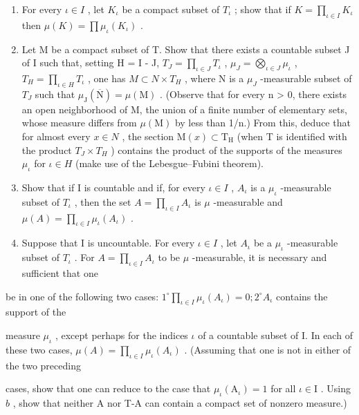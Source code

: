 \begin{enumerate}
\def\labelenumi{\alph{enumi})}
\item
  For every \(\iota \in I\) , let \(K_{\iota}\) be a compact subset of \(T_{\iota}\) ; show that if \(K = \prod_{\iota \in I} K_{\iota}\) then \(\mu(K) = \prod \mu_{\iota}(K_{\iota})\) .
\item
  Let M be a compact subset of T. Show that there exists a countable subset J of I such that, setting H = I - J, \(T_{J} = \prod_{\iota \in J} T_{\iota}\) , \(\mu_{J} = \bigotimes_{\iota \in J} \mu_{\iota}\) , \(T_{H} = \prod_{\iota \in H} T_{\iota}\) , one has \(M \subset N \times T_{H}\) , where N is a \(\mu_{J}\) -measurable subset of \(T_{J}\) such that \(\mu_{\mathrm{J}}(\overline{\mathrm{N}}) = \mu(\mathrm{M})\) . (Observe that for every n \textgreater{} 0, there exists an open neighborhood of M, the union of a finite number of elementary sets, whose measure differs from \(\mu(\mathrm{M})\) by less than 1/n.) From this, deduce that for almost every \(x \in N\) , the section \(\mathrm{M}(x) \subset \mathrm{T}_{\mathrm{H}}\) (when T is identified with the product \(T_{J} \times T_{H}\) ) contains the product of the supports of the measures \(\mu_{\iota}\) for \(\iota \in H\) (make use of the Lebesgue--Fubini theorem).
\item
  Show that if I is countable and if, for every \(\iota \in I\) , \(A_{\iota}\) is a \(\mu_{\iota}\) -measurable subset of \(T_{\iota}\) , then the set \(A = \prod_{\iota \in I} A_{\iota}\) is \(\mu\) -measurable and \(\mu(A) = \prod_{\iota \in I} \mu_{\iota}(A_{\iota})\) .
\item
  Suppose that I is uncountable. For every \(\iota \in I\) , let \(A_{\iota}\) be a \(\mu_{\iota}\) -measurable subset of \(T_{\iota}\) . For \(A = \prod_{\iota \in I} A_{\iota}\) to be \(\mu\) -measurable, it is necessary and sufficient that one
\end{enumerate}

be in one of the following two cases: \(1^{\circ}\prod_{\iota \in I}\mu_{\iota}(A_{\iota}) = 0;2^{\circ}A_{\iota}\) contains the support of the

measure \(\mu_{\iota}\) , except perhaps for the indices \(\iota\) of a countable subset of I. In each of these two cases, \(\mu(A) = \prod_{\iota \in I} \mu_{\iota}(A_{\iota})\) . (Assuming that one is not in either of the two preceding

cases, show that one can reduce to the case that \(\mu_{\iota}(\mathrm{A}_{\iota}) = 1\) for all \(\iota \in \mathrm{I}\) . Using \(b\) , show that neither A nor T-A can contain a compact set of nonzero measure.)

